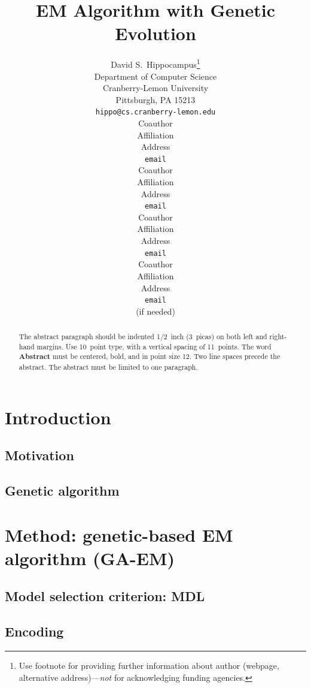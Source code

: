 \documentclass{article} %
\title{EM Algorithm with Genetic Evolution}
\author{
David S.~Hippocampus\thanks{ Use footnote for providing further information
about author (webpage, alternative address)---\emph{not} for acknowledging
funding agencies.} \\
Department of Computer Science\\
Cranberry-Lemon University\\
Pittsburgh, PA 15213 \\
\texttt{hippo@cs.cranberry-lemon.edu} \\
\And
Coauthor \\
Affiliation \\
Address \\
\texttt{email} \\
\AND
Coauthor \\
Affiliation \\
Address \\
\texttt{email} \\
\And
Coauthor \\
Affiliation \\
Address \\
\texttt{email} \\
\And
Coauthor \\
Affiliation \\
Address \\
\texttt{email} \\
(if needed)\\
}
\begin{document}
\maketitle

\begin{abstract}
The abstract paragraph should be indented 1/2~inch (3~picas) on both left and
right-hand margins. Use 10~point type, with a vertical spacing of 11~points.
The word \textbf{Abstract} must be centered, bold, and in point size 12. Two
line spaces precede the abstract. The abstract must be limited to one
paragraph.
\end{abstract}

\section{Introduction}

\subsection{Motivation}

\subsection{Genetic algorithm}


\section{Method: genetic-based EM algorithm (GA-EM)}

\subsection{Model selection criterion: MDL}

\subsection{Encoding}
\end{document}
